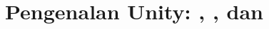 \documentclass[../../main.tex]{subfiles}
\begin{document}
\chapter{Pengenalan Unity: , , dan }
\label{chap:pengenalan-unity}
























\ifSubfilesClassLoaded{%
  \clearpage
}{}
\end{document}
